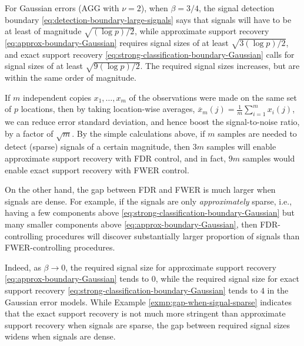 \begin{example} \label{exmp:gap-when-signal-sparse}
For Gaussian errors (AGG with $\nu = 2$), when $\beta = 3/4$, the signal detection boundary \eqref{eq:detection-boundary-large-signals} says that signals will have to be at least of magnitude $\sqrt{(\log{p})/2}$, 
while approximate support recovery \eqref{eq:approx-boundary-Gaussian} requires signal sizes of at least $\sqrt{3(\log{p})/2}$, 
and exact support recovery \eqref{eq:strong-classification-boundary-Gaussian} calls for signal sizes of at least $\sqrt{9(\log{p})/2}$. 
The required signal sizes increases, but are within the same order of magnitude.

If $m$ independent copies $x_1,\ldots,x_m$ of the observations were made on the same set of $p$ locations, then by taking location-wise averages, $\overline{x}_{m}(j) = \frac{1}{m}\sum_{i=1}^{m} x_i(j)$,
we can reduce error standard deviation, and hence boost the signal-to-noise ratio, by a factor of $\sqrt{m}$.
By the simple calculations above, if $m$ samples are needed to detect (sparse) signals of a certain magnitude, then $3m$ samples will enable approximate support recovery with FDR control, and in fact, $9m$ samples would enable exact support recovery with FWER control.
\end{example}

On the other hand, the gap between FDR and FWER is much larger when signals are dense.
For example, if the signals are only \emph{approximately} sparse, i.e., having a few components above \eqref{eq:strong-classification-boundary-Gaussian} but many smaller components above  \eqref{eq:approx-boundary-Gaussian}, then FDR-controlling procedures will discover substantially larger proportion of signals than FWER-controlling procedures.

Indeed, as $\beta\to0$, the required signal size for approximate support recovery \eqref{eq:approx-boundary-Gaussian} tends to 0, while the required signal size for exact support recovery \eqref{eq:strong-classification-boundary-Gaussian} tends to $4$ in the Gaussian error models.
While Example \ref{exmp:gap-when-signal-sparse} indicates that the exact support recovery is not much more stringent than approximate support recovery when signals are sparse, the gap between required signal sizes widens when signals are dense. 

